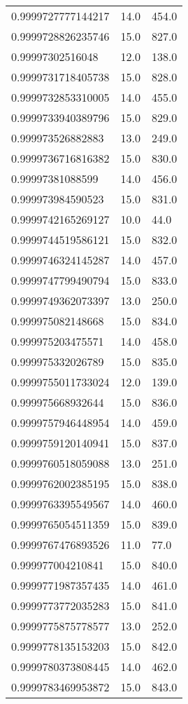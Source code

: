\begin{center}
\begin{supertabular}[H]{p{0.30\textwidth}p{0.05\textwidth}p{0.05\textwidth}}
0.9999727777144217 & 14.0 & 454.0 \\ 
0.9999728826235746 & 15.0 & 827.0 \\ 
0.99997302516048 & 12.0 & 138.0 \\ 
0.9999731718405738 & 15.0 & 828.0 \\ 
0.9999732853310005 & 14.0 & 455.0 \\ 
0.9999733940389796 & 15.0 & 829.0 \\ 
0.999973526882883 & 13.0 & 249.0 \\ 
0.9999736716816382 & 15.0 & 830.0 \\ 
0.99997381088599 & 14.0 & 456.0 \\ 
0.999973984590523 & 15.0 & 831.0 \\ 
0.9999742165269127 & 10.0 & 44.0 \\ 
0.9999744519586121 & 15.0 & 832.0 \\ 
0.9999746324145287 & 14.0 & 457.0 \\ 
0.9999747799490794 & 15.0 & 833.0 \\ 
0.9999749362073397 & 13.0 & 250.0 \\ 
0.999975082148668 & 15.0 & 834.0 \\ 
0.999975203475571 & 14.0 & 458.0 \\ 
0.999975332026789 & 15.0 & 835.0 \\ 
0.9999755011733024 & 12.0 & 139.0 \\ 
0.999975668932644 & 15.0 & 836.0 \\ 
0.9999757946448954 & 14.0 & 459.0 \\ 
0.9999759120140941 & 15.0 & 837.0 \\ 
0.9999760518059088 & 13.0 & 251.0 \\ 
0.9999762002385195 & 15.0 & 838.0 \\ 
0.9999763395549567 & 14.0 & 460.0 \\ 
0.9999765054511359 & 15.0 & 839.0 \\ 
0.9999767476893526 & 11.0 & 77.0 \\ 
0.999977004210841 & 15.0 & 840.0 \\ 
0.9999771987357435 & 14.0 & 461.0 \\ 
0.9999773772035283 & 15.0 & 841.0 \\ 
0.9999775875778577 & 13.0 & 252.0 \\ 
0.9999778135153203 & 15.0 & 842.0 \\ 
0.9999780373808445 & 14.0 & 462.0 \\ 
0.9999783469953872 & 15.0 & 843.0 \\ 

\end{supertabular}
\end{center}
